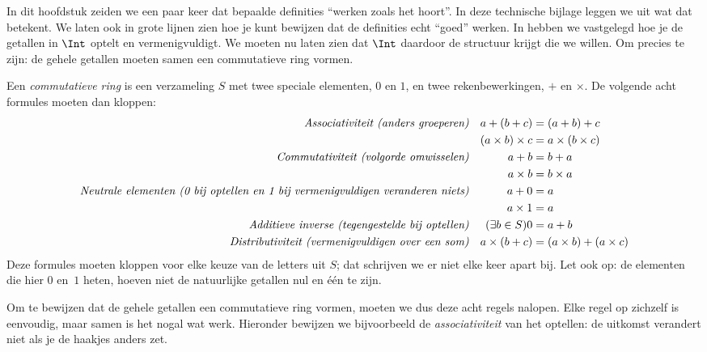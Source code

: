 \documentclass[../../../include/open-logic-section]{subfiles}
\begin{document}
	
In dit hoofdstuk zeiden we een paar keer dat bepaalde definities
``werken zoals het hoort''. In deze technische bijlage leggen we uit
wat dat betekent. We laten ook in grote lijnen zien hoe je kunt
bewijzen dat de definities echt ``goed'' werken.
In  hebben we vastgelegd hoe je de getallen in $\Int$
optelt en vermenigvuldigt. We moeten nu laten zien dat $\Int$ daardoor
de structuur krijgt die we willen. Om precies te zijn: de gehele
getallen moeten samen een commutatieve ring vormen.
\begin{defn}
	Een \emph{commutatieve ring} is een verzameling $S$ met twee speciale elementen, $0$ en $1$, en twee rekenbewerkingen, $+$ en $\times$. De volgende acht formules moeten dan kloppen:
	\begin{align*}
		\emph{Associativiteit (anders groeperen)}&&a + (b+ c) & = (a + b) + c \\
		&& (a \times b) \times c & = a \times (b\times c)\\
		\emph{Commutativiteit (volgorde omwisselen)}&&a + b &= b+ a  \\
		&&  a \times b&= b\times a\\ 
		\emph{Neutrale elementen (0 bij optellen en 1 bij vermenigvuldigen veranderen niets)}&&a + 0 &= a \\
		&& a \times 1 &= a\\
		\emph{Additieve inverse (tegengestelde bij optellen)}&&(\exists b\in S)0&=a + b\\
		\emph{Distributiviteit (vermenigvuldigen over een som)}&&a \times (b+ c ) &= (a \times b) + (a \times c)
	\end{align*}
	Deze formules moeten kloppen voor elke keuze van de letters uit $S$; dat schrijven we er niet elke keer apart bij. Let ook op: de elementen die hier $0$ en~$1$ heten, hoeven niet de natuurlijke getallen nul en één te zijn.
\end{defn}
Om te bewijzen dat de gehele getallen een commutatieve ring vormen,
moeten we dus deze acht regels nalopen. Elke regel op zichzelf is
eenvoudig, maar samen is het nogal wat werk. Hieronder bewijzen we
bijvoorbeeld de \emph{associativiteit} van het optellen: de uitkomst
verandert niet als je de haakjes anders zet.
\end{document}
